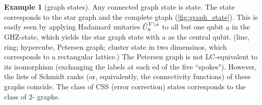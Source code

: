 \documentclass[
10pt,
aps,
pra,
linenumbers,
floatfix,
]{revtex4-2}
\theoremstyle{plain}
\newtheorem{question}{Question}
\theoremstyle{definition}
\newtheorem{observation}{Observation}
\newtheorem{example}{Example}
\newtheorem{problem}{Problem}
\newcommand{\U}{\hat{U}}
\begin{document}
\begin{example}[graph states]
	Any connected graph state is  state.
	The  state corresponds to the star graph and the complete gtaph (\cref{fig:graph_state}). 
	This is easily seen by applying Hadamard unitaries $\U_\hdm^{V\backslash a}$ to all but one qubit $a$ in the GHZ-state, 
	which yields the star graph state with $a$ as the central qubit.
	(line, ring; 
	hypercube, Petersen graph; 
	cluster state in two dimensinos, which corresponds to a rectangular lattice.)
	The Petersen graph is not LC-equivalent to its isomorphism (exchanging the labels at each ed of the five ``spokes"). However, the lists of Schmidt ranks (or, equivalently, the connectivity functions) of these graphs coincide.
	The class of CSS (error correction) states corresponds to the class of 2- graphs.
	\cite{heinEntanglementGraphStates2006}
\end{example}
\end{document}
